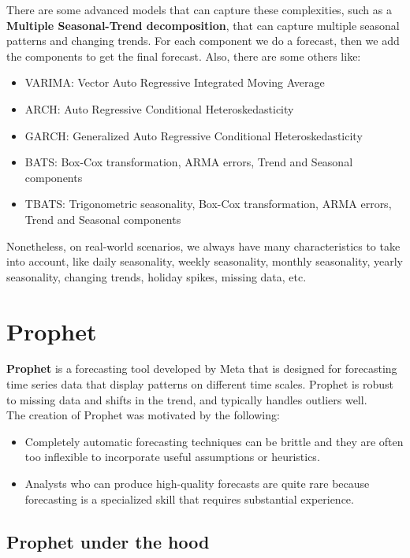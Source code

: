 There are some advanced models that can capture these complexities, such as a \textbf{Multiple
Seasonal-Trend decomposition}, that can capture multiple seasonal patterns and changing trends.
For each component we do a forecast, then we add the components to get the final forecast.
Also, there are some others like:
\begin{itemize}
    \item VARIMA: Vector Auto Regressive Integrated Moving Average
    \item ARCH: Auto Regressive Conditional Heteroskedasticity
    \item GARCH: Generalized Auto Regressive Conditional Heteroskedasticity
    \item BATS: Box-Cox transformation, ARMA errors, Trend and Seasonal components
    \item TBATS: Trigonometric seasonality, Box-Cox transformation, ARMA errors, Trend and Seasonal components
\end{itemize}

Nonetheless, on real-world scenarios, we always have many characteristics to take into account, 
like daily seasonality, weekly seasonality, monthly seasonality, yearly seasonality, changing trends,
holiday spikes, missing data, etc.\\

\section{Prophet}

\textbf{Prophet} is a forecasting tool developed by Meta that is designed for forecasting
time series data that display patterns on different time scales. Prophet is robust to missing
data and shifts in the trend, and typically handles outliers well.\\

The creation of Prophet was motivated by the following:
\begin{itemize}
    \item Completely automatic forecasting techniques can be brittle and they are often
    too inflexible to incorporate useful assumptions or heuristics.
    \item Analysts who can produce high-quality forecasts are quite rare because forecasting
    is a specialized skill that requires substantial experience.
\end{itemize}

\subsection{Prophet under the hood}

